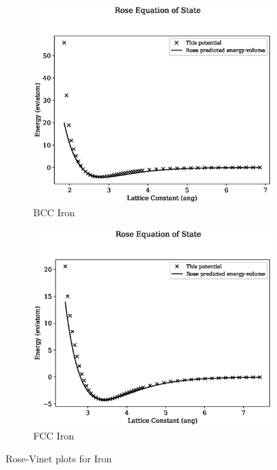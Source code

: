 \begin{figure}[htb]
\begin{subfigure}{.48\textwidth}
  \centering
  \includegraphics[width=.94\linewidth]{chapters/potentials_fe_pd_ru/fepd_potential/eos/rose_plot_bp_0.eps}  
  \caption{BCC Iron}
  \label{fig:rose-vinet-bcc-fe}
\end{subfigure}
\begin{subfigure}{.48\textwidth}
  \centering
  \includegraphics[width=.94\linewidth]{chapters/potentials_fe_pd_ru/fepd_potential/eos/rose_plot_bp_1.eps}  
  \caption{FCC Iron}
  \label{fig:rose-vinet-fcc-fe}
\end{subfigure}
\caption{Rose-Vinet plots for Iron}
\label{fig:fe-rosevinet}
\end{figure}

